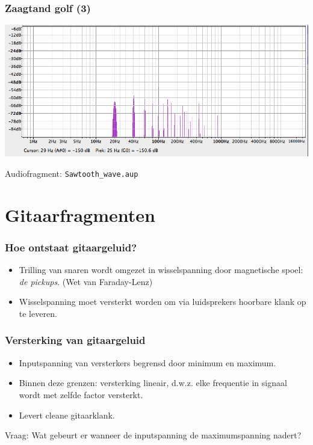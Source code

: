 \documentclass[compress, darktitle, framenumber, totalframenumber]{beamer}
\begin{document}
\begin{frame}
\frametitle{Zaagtand golf (3)}
\includegraphics[width=\textwidth]{images/Sawtooth_wave.png}
\begin{block}{Audiofragment:}
\texttt{Sawtooth\_wave.aup}
\end{block}
\end{frame}

\section{Gitaarfragmenten}

\begin{frame}
\frametitle{Hoe ontstaat gitaargeluid?}
\begin{itemize}
\item Trilling van snaren wordt omgezet in wisselspanning door magnetische spoel: \textit{de pickups}. (Wet van Faraday-Lenz)
\item Wisselspanning moet versterkt worden om via luidsprekers hoorbare klank op te leveren. 
\end{itemize}
\end{frame}

\begin{frame}
\frametitle{Versterking van gitaargeluid}
\begin{itemize}
\item Inputspanning van versterkers begrensd door minimum en maximum.
\item Binnen deze grenzen: versterking lineair, d.w.z. elke frequentie in signaal wordt met zelfde factor versterkt.
\item Levert cleane gitaarklank. 
\end{itemize}
\begin{alertblock}{Vraag:}
Wat gebeurt er wanneer de inputspanning de maximumspanning nadert?
\end{alertblock}
\end{frame}
\end{document}
